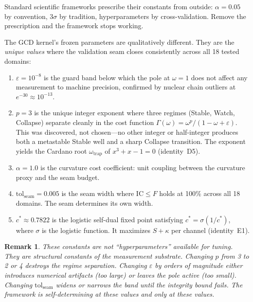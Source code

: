 \documentclass[
  aps,
  prd,
  twocolumn,
  superscriptaddress,
  nofootinbib,
  floatfix
]{revtex4-2}
\newtheorem{remark}{Remark}
\newcommand{\Gam}{\Gamma}
\newcommand{\eps}{\varepsilon}
\newcommand{\tolseam}{\mathrm{tol}_{\mathrm{seam}}}
\newcommand{\IC}{\mathrm{IC}}
\begin{document}
Standard scientific frameworks prescribe their constants from outside:
$\alpha = 0.05$ by convention, $3\sigma$ by tradition, hyperparameters
by cross-validation.  Remove the prescription and the framework stops
working.

The GCD kernel's frozen parameters are qualitatively different.  They
are the \emph{unique values} where the validation seam closes
consistently across all 18 tested domains:

\begin{enumerate}[leftmargin=*,label=(\roman*)]
\item $\eps = 10^{-8}$ is the guard band below which the pole at
  $\omega = 1$ does not affect any measurement to machine precision,
  confirmed by nuclear chain outliers at $e^{-30} \approx 10^{-13}$.

\item $p = 3$ is the unique integer exponent where three regimes
  (Stable, Watch, Collapse) separate cleanly in the cost function
  $\Gam(\omega) = \omega^p/(1 - \omega + \eps)$.  This was
  discovered, not chosen---no other integer or half-integer produces
  both a metastable Stable well and a sharp Collapse transition.
  The exponent yields the Cardano root $\omega_{\mathrm{trap}}$
  of $x^3 + x - 1 = 0$ (identity~D5).

\item $\alpha = 1.0$ is the curvature cost coefficient: unit coupling
  between the curvature proxy and the seam budget.

\item $\tolseam = 0.005$ is the seam width where $\IC \leq F$ holds
  at 100\% across all 18 domains.  The seam determines its own width.

\item $c^* \approx 0.7822$ is the logistic self-dual fixed point
  satisfying $c^* = \sigma(1/c^*)$, where $\sigma$ is the logistic
  function.  It maximizes $S + \kappa$ per channel (identity~E1).
\end{enumerate}

\begin{remark}
These constants are not ``hyperparameters'' available for tuning.
They are structural constants of the measurement substrate.  Changing
$p$ from 3 to 2 or 4 destroys the regime separation.  Changing
$\eps$ by orders of magnitude either introduces numerical artifacts
(too large) or leaves the pole active (too small).  Changing
$\tolseam$ widens or narrows the band until the integrity bound
fails.  The framework is self-determining at these values and only at
these values.
\end{remark}
\end{document}
